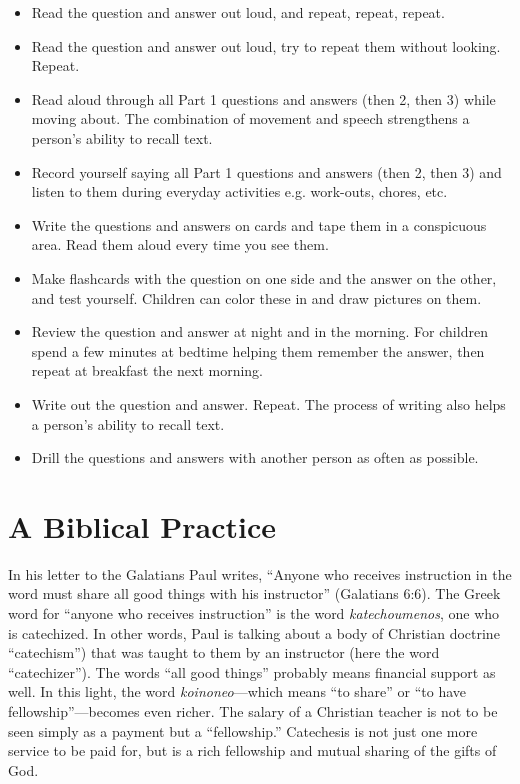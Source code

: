 \documentclass[titlepage]{memoir}
\begin{document}
\begin{itemize}
	\item Read the question and answer out loud, and repeat, repeat, repeat.
	\item Read the question and answer out loud, try to repeat them without looking. Repeat.
	\item Read aloud through all Part 1 questions and answers (then 2, then 3) while moving about. The combination of movement and speech strengthens a person's ability to recall text.
	\item Record yourself saying all Part 1 questions and answers (then 2, then 3) and listen to them during everyday activities e.g. work-outs, chores, etc.
	\item Write the questions and answers on cards and tape them in a conspicuous area. Read them aloud every time you see them.
	\item Make flashcards with the question on one side and the answer on the other, and test yourself. Children can color these in and draw pictures on them.
	\item Review the question and answer at night and in the morning. For children spend a few minutes at bedtime helping them remember the answer, then repeat at breakfast the next morning.
	\item Write out the question and answer. Repeat. The process of writing also helps a person's ability to recall text.
	\item Drill the questions and answers with another person as often as possible.
\end{itemize}  

\section{A Biblical Practice}
In his letter to the Galatians Paul writes, ``Anyone who receives instruction in the word must share all good things with his instructor'' (Galatians 6:6). The Greek word for ``anyone who receives instruction'' is the word \emph{katechoumenos}, one who is catechized. In other words, Paul is talking about a body of Christian doctrine ``catechism'') that was taught to them by an instructor (here the word ``catechizer''). The words ``all good things'' probably means financial support as well. In this light, the word \emph{koinoneo}\thinspace{}---\thinspace{}which means ``to share'' or ``to have fellowship''\thinspace{}---\thinspace{}becomes even richer. The salary of a Christian teacher is not to be seen simply as a payment but a ``fellowship.'' Catechesis is not just one more service to be paid for, but is a rich fellowship and mutual sharing of the gifts of God.
\end{document}
